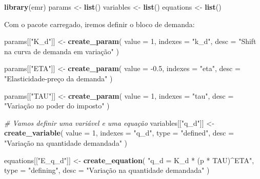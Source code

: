 \documentclass[12pt,twoside]{article}
\newenvironment{Shaded}{\begin{snugshade}}{\end{snugshade}}
\newcommand{\CommentTok}[1]{\textcolor[rgb]{0.56,0.35,0.01}{\textit{#1}}}
\newcommand{\DataTypeTok}[1]{\textcolor[rgb]{0.13,0.29,0.53}{#1}}
\newcommand{\DecValTok}[1]{\textcolor[rgb]{0.00,0.00,0.81}{#1}}
\newcommand{\FloatTok}[1]{\textcolor[rgb]{0.00,0.00,0.81}{#1}}
\newcommand{\KeywordTok}[1]{\textcolor[rgb]{0.13,0.29,0.53}{\textbf{#1}}}
\newcommand{\NormalTok}[1]{#1}
\newcommand{\StringTok}[1]{\textcolor[rgb]{0.31,0.60,0.02}{#1}}
\let\oldShaded\Shaded
\let\endoldShaded\endShaded
\renewenvironment{Shaded}{\footnotesize\oldShaded}{\endoldShaded}
\begin{document}
\begin{Shaded}
\begin{Highlighting}[]
\KeywordTok{library}\NormalTok{(emr)}
\NormalTok{params <-}\StringTok{ }\KeywordTok{list}\NormalTok{()}
\NormalTok{variables <-}\StringTok{ }\KeywordTok{list}\NormalTok{()}
\NormalTok{equations <-}\StringTok{ }\KeywordTok{list}\NormalTok{()}
\end{Highlighting}
\end{Shaded}

Com o pacote carregado, iremos definir o bloco de demanda:

\begin{Shaded}
\begin{Highlighting}[]
\NormalTok{params[[}\StringTok{"K_d"}\NormalTok{]] <-}\StringTok{ }\KeywordTok{create_param}\NormalTok{(}
  \DataTypeTok{value =} \DecValTok{1}\NormalTok{,}
  \DataTypeTok{indexes =} \StringTok{"k_d"}\NormalTok{,}
  \DataTypeTok{desc =} \StringTok{"Shift na curva de demanda em variação"}
\NormalTok{)}

\NormalTok{params[[}\StringTok{"ETA"}\NormalTok{]] <-}\StringTok{ }\KeywordTok{create_param}\NormalTok{(}
  \DataTypeTok{value =} \FloatTok{-0.5}\NormalTok{,}
  \DataTypeTok{indexes =} \StringTok{"eta"}\NormalTok{,}
  \DataTypeTok{desc =} \StringTok{"Elasticidade-preço da demanda"}
\NormalTok{)}

\NormalTok{params[[}\StringTok{"TAU"}\NormalTok{]] <-}\StringTok{ }\KeywordTok{create_param}\NormalTok{(}
  \DataTypeTok{value =} \DecValTok{1}\NormalTok{,}
  \DataTypeTok{indexes =} \StringTok{"tau"}\NormalTok{,}
  \DataTypeTok{desc =} \StringTok{"Variação no poder do imposto"}
\NormalTok{)}

\CommentTok{# Vamos definir uma variável e uma equação}
\NormalTok{variables[[}\StringTok{"q_d"}\NormalTok{]] <-}\StringTok{ }\KeywordTok{create_variable}\NormalTok{(}
  \DataTypeTok{value =} \DecValTok{1}\NormalTok{,}
  \DataTypeTok{indexes =} \StringTok{"q_d"}\NormalTok{,}
  \DataTypeTok{type =} \StringTok{"defined"}\NormalTok{,}
  \DataTypeTok{desc =} \StringTok{"Variação na quantidade demandada"}
\NormalTok{)}

\NormalTok{equations[[}\StringTok{"E_q_d"}\NormalTok{]] <-}\StringTok{ }\KeywordTok{create_equation}\NormalTok{(}
  \StringTok{"q_d = K_d * (p * TAU)^ETA"}\NormalTok{,}
  \DataTypeTok{type =} \StringTok{"defining"}\NormalTok{,}
  \DataTypeTok{desc =} \StringTok{"Variação na quantidade demandada"}
\NormalTok{)}
\end{Highlighting}
\end{Shaded}
\end{document}
